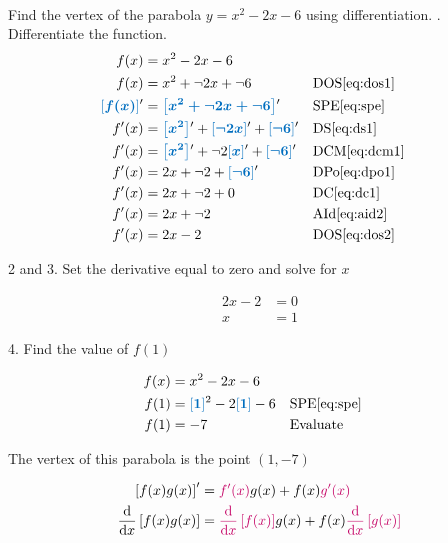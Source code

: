 \documentclass[20150903-160354-rs2.2-MarksMathNotebook.tex]{subfiles}
\begin{document}
\begin{example}[id:20150923-152515] \label{20150923-152515} \hfill \\
Find the vertex of the parabola $y=x^2-2x-6$ using differentiation.
\soln
{}. Differentiate the function.
\begin{align*}
f(x) &=x^2-2x-6 \\
f(x) &=x^2+ \neg 2x + \neg 6 && \text{DOS} \eqref{eq:dos1} \\
\farg{f(x)}' &= \farg{x^2+ \neg 2x + \neg 6}' && \text{SPE} \eqref{eq:spe} \\
f'(x) &= \farg{x^2}'+ \farg{\neg 2x}' + \farg{\neg 6}' && \text{DS} \eqref{eq:ds1} \\
f'(x) &= \farg{x^2}'+ \neg 2 \farg{x}' + \farg{\neg 6}' && \text{DCM} \eqref{eq:dcm1} \\
f'(x) &= 2x + \neg 2 + \farg{\neg 6}' && \text{DPo} \eqref{eq:dpo1} \\
f'(x) &= 2x + \neg 2 + 0 && \text{DC} \eqref{eq:dc1} \\
f'(x) &= 2x + \neg 2 && \text{AId} \eqref{eq:aid2} \\
f'(x) &= 2x - 2 && \text{DOS} \eqref{eq:dos2}
\end{align*}

2 and 3. Set the derivative equal to zero and solve for $x$

\begin{align*}
2x-2 & = 0\\
x &= 1
\end{align*}

4. Find the value of $f(1)$

\begin{align*}
f(x) & = x^2-2x-6 \\
f(1) &= \farg{1}^2-2\farg{1}-6 && \text{SPE} \eqref{eq:spe} \\
f(1) &= -7  &&\text{Evaluate}
\end{align*}

The vertex of this parabola is the point $(1,-7)$
\end{example}


\begin{arule}
\begin{align}
	\left[f(x)g(x) \right]' &= \cRed{f'(x)}g(x) + f(x)\cRed{g'(x)} \label{eq:dpr1} \\
	\dfrac{\dd}{\dx} \left[f(x)g(x) \right] &= \cRed{\dfrac{\dd}{\dx} \left[f(x) \right]}g(x) + f(x)\cRed{\dfrac{\dd}{\dx} \left[g(x)\right]}  \label{eq:dpr2}
\end{align}
\end{arule}
\end{document}
